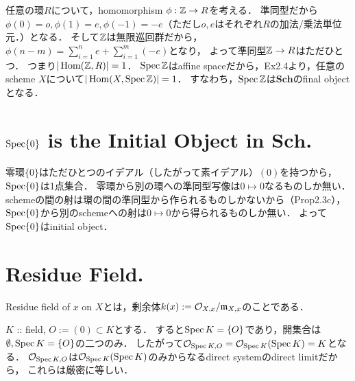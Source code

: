 \documentclass[a4paper]{jsarticle}
\newcommand{\Sch}{\mathbf{Sch}}
\begin{document}
    任意の環$R$について，homomorphism $\phi: \mathbb{Z} \to R$を考える．
    準同型だから$\phi(0)=o, \phi(1)=e, \phi(-1)=-e$（ただし$o, e$はそれぞれ$R$の加法/乗法単位元．）となる．
    そして$\mathbb{Z}$は無限巡回群だから，$\phi(n-m)=\sum_{i=1}^n e+\sum_{i=1}^{m} (-e)$となり，
    よって準同型$\mathbb{Z} \to R$はただひとつ．
    つまり$|\operatorname{Hom}(\mathbb{Z}, R)|=1$．
    $\operatorname{Spec} \mathbb{Z}$はaffine spaceだから，Ex2.4より，任意のscheme $X$について$|\operatorname{Hom}(X, \operatorname{Spec} \mathbb{Z})|=1$．
    すなわち，$\operatorname{Spec} \mathbb{Z}$は$\Sch$のfinal objectとなる．

\section{$\operatorname{Spec} \{0\}$ is the Initial Object in $\Sch$.} %
    零環$\{0\}$はただひとつのイデアル（したがって素イデアル）$(0)$を持つから，$\operatorname{Spec} \{0\}$は1点集合．
    零環から別の環への準同型写像は$0 \mapsto 0$なるものしか無い．
    schemeの間の射は環の間の準同型から作られるものしかないから（Prop2.3c），
    $\operatorname{Spec} \{0\}$から別のschemeへの射は$0 \mapsto 0$から得られるものしか無い．
    よって$\operatorname{Spec} \{0\}$はinitial object．

\section{Residue Field.} %
    Residue field of $x$ on $X$とは，剰余体$k(x):=\mathcal{O}_{X,x}/\mathfrak{m}_{X,x}$のことである．

    $K$ :: field, $O:=(0) \subset K$とする．
    すると$\operatorname{Spec} K=\{O\}$であり，開集合は$\emptyset, \operatorname{Spec} K=\{O\}$の二つのみ．
    したがって$\mathcal{O}_{\operatorname{Spec} K, O}=\mathcal{O}_{\operatorname{Spec} K}(\operatorname{Spec} K)=K$となる．
    $\mathcal{O}_{\operatorname{Spec} K, O}$は$\mathcal{O}_{\operatorname{Spec} K}(\operatorname{Spec} K)$のみからなるdirect systemのdirect limitだから，
    これらは厳密に等しい．
    
\end{document}
